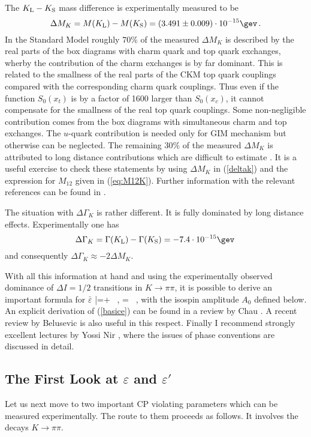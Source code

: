 The 
$K_{\rm L}-K_{\rm S}$
mass difference is experimentally measured to be 
\begin{equation}\label{DMEXP}
\Delta M_K=M(K_{\rm L})-M(K_{\rm S}) = 
(3.491\pm 0.009) \cdot 10^{-15} \gev\,.
\end{equation}
In the Standard Model roughly $70\%$ of the measured $\Delta M_K$
is described by the real parts of the box diagrams with charm quark
and top quark exchanges, wherby the contribution of the charm exchanges
is by far dominant. This is related to the smallness of the real parts
of the CKM top quark couplings compared with the corresponding charm
quark couplings. Thus even if the function $S_0(x_t)$ is by a factor
of 1600 larger than $S_0(x_c)$, it cannot compensate for the smallness
of the real top quark couplings. 
Some non-negligible contribution comes from the box diagrams with
simultaneous charm and top exchanges.
The $u$-quark contribution is needed only
for GIM mechanism but otherwise can be neglected.
The remaining $30 \%$ of the measured $\Delta M_K$ is attributed to long 
distance contributions which are difficult to estimate \cite{GERAR}.
It is a useful exercise to check these statements by using 
$\Delta M_K$ in (\ref{deltak}) and the expression for $M_{12}$ given 
in (\ref{eq:M12K}).
Further information with the relevant references can be found in 
\cite{HNa}.

The situation with $\Delta \Gamma_K$ is rather different.
It is fully dominated by long distance effects. Experimentally
one has
\begin{equation}
\Delta \Gamma_K=\Gamma(K_{\rm L})-\Gamma(K_{\rm S}) = 
-7.4 \cdot 10^{-15} \gev\,
\end{equation}
and consequently $\Delta\Gamma_K\approx-2 \Delta M_K$.

With all this information at hand and using  the experimentally 
observed dominance of $\Delta I=1/2$ transitions in $K\to \pi\pi$,
it is possible to derive an important formula for $\bar\varepsilon$
\be\label{basice}
\bar\varepsilon=+
~, \quad\qquad \xi = ~,
\ee
with the isospin amplitude $A_0$ defined below.
An explicit derivation of (\ref{basice}) can be found in a review
by Chau \cite{CHAU83}. A recent review by Belusevic \cite{BELU} is
also useful in this respect. 
Finally I recommend strongly  excellent lectures
by Yossi Nir \cite{NIRSLAC}, where the issues of phase conventions
are discussed in detail.
\subsection{The First Look at $\varepsilon$ and $\varepsilon'$}
Let us next move to two important CP violating  parameters which 
can be measured experimentally. The route to them proceeds as follows.
It involves the decays $K\to\pi\pi$.

